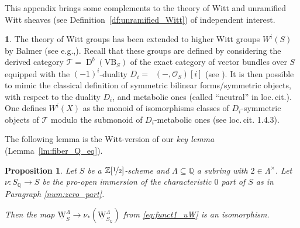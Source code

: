 \documentclass[11pt]{article}
\newcommand{\eg}{e.g.,\xspace}
\numberwithin{equation}{section}\renewcommand{\encodingdefault}{TU}
\newcommand{\T}{\mathscr T}
\newcommand{\uW}{\underline{\mathrm W}}
\DeclareMathOperator{\uHom}{\underline{Hom}}
\DeclareMathOperator{\Der}{D}
\newcommand{\ZZot} {\mathbb Z[\nicefrac 1 2]}
\newcommand{\QQ} {\mathbb Q}
\newtheorem{prop}[thm]{Proposition}
\theoremstyle{remark}
\theoremstyle{definition}
\newtheorem{num}[thm]{}
\numberwithin{equation}{thm}
\begin{document}
This appendix brings some complements to the theory of Witt and unramified Witt sheaves
(see Definition~\ref{df:unramified_Witt}) of independent interest.

\begin{num}\label{num:Balmer}
The theory of Witt groups has been extended to
higher Witt groups $W^i(S)$ by Balmer (see \eg \cite{BalmerBasic}).
Recall that these groups are defined by considering the deri\-ved category
$\T=\Der^b(\mathrm{VB}_S)$ of the exact category of vector bundles over $S$
equipped with the $(-1)^i$-duality $D_i=\uHom(-,\mathcal O_S)[i]$
(see \cite[1.4.12]{BalmerBasic}).
It is then possible to mimic the classical definition of
symmetric bilinear forms/symmetric objects, with respect to the duality $D_i$, and metabolic ones (called ``neutral'' in loc.\,cit.).
One defines $W^i(X)$ as the monoid of isomorphisms classes of
$D_i$-symmetric objects of $\T$ modulo the submonoid of $D_i$-metabolic ones (see loc.\,cit. 1.4.3).

The following lemma is the Witt-version of our \emph{key lemma} (Lemma~\ref{lm:fiber_Q_eq}).
\end{num}
\begin{prop}\label{prop:Witt_2inverted}
Let $S$ be a $\ZZot$-scheme and $\Lambda \subseteq \QQ$ a subring with $2 \in \Lambda^\times$.
Let $\nu:S_\QQ \to S$ be the pro-open immersion of the characteristic $0$ part of $S$
as in Paragraph \ref{num:zero_part}.

Then the map $\uW_S^\Lambda \to \nu_*(\uW_{S_\QQ}^\Lambda)$ from \eqref{eq:funct1_uW} is an isomorphism.
\end{prop}
\end{document}
